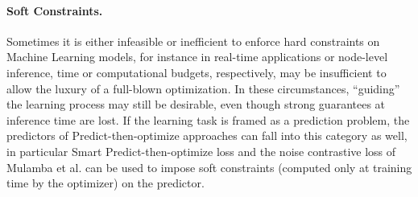 \paragraph{Soft Constraints.}
Sometimes it is either infeasible or inefficient to enforce hard constraints on Machine Learning models, for instance in real-time applications or node-level inference, time or computational budgets, respectively, may be insufficient to allow the luxury of a full-blown optimization. In these circumstances, ``guiding'' the learning process may still be desirable, even though strong guarantees at inference time are lost. %
%
If the learning task is framed as a prediction problem, the predictors of Predict-then-optimize approaches can fall into this category as well, in particular Smart Predict-then-optimize loss and the noise contrastive loss of Mulamba et al. can be used to impose soft constraints (computed only at training time by the optimizer) on the predictor.

